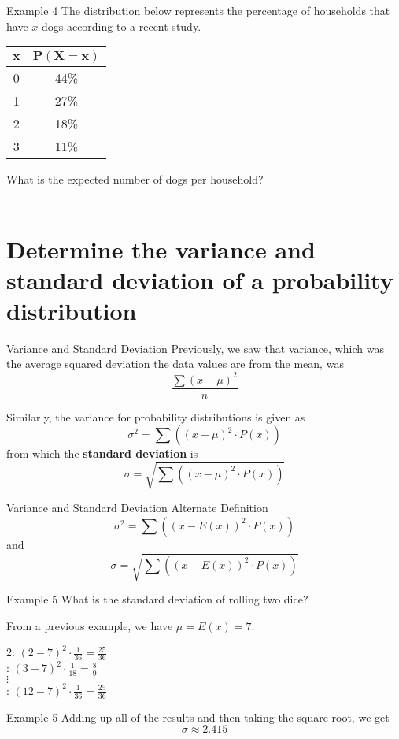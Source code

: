 \documentclass[t]{beamer}
\begin{document}
\begin{frame}{Example 4}
The distribution below represents the percentage of households that have $x$ dogs according to a recent study. \newline
\begin{center}
\begin{tabular}{c|c}
$\bm{x}$ & $\bm{P(X=x)}$ \\ \hline
0 & 44\% \\
1 & 27\% \\
2 & 18\% \\
3 & 11\%
\end{tabular}
\end{center}
What is the expected number of dogs per household?	\newline\\
	\newline\\
\end{frame}

\section{Determine the variance and standard deviation of a probability distribution}

\begin{frame}{Variance and Standard Deviation}
Previously, we saw that variance, which was the average squared deviation the data values are from the mean, was
\[\frac{\sum \left(x-\mu\right)^2}{n}\]
\pause

Similarly, the variance for probability distributions is given as
\[\sigma^2 = \sum\left((x-\mu)^2 \cdot P(x)\right)\]	\pause
from which the {\color{blue}\textbf{standard deviation}} is 
\[\sigma = \sqrt{\sum\left((x-\mu)^2 \cdot P(x)\right)}\]
\end{frame}

\begin{frame}{Variance and Standard Deviation Alternate Definition}
\[\sigma^2 = \sum\left((x-E(x))^2 \cdot P(x)\right)\]	\pause
and
\[\sigma = \sqrt{\sum\left((x-E(x))^2 \cdot P(x)\right)}\]
\end{frame}


\begin{frame}{Example 5}
What is the standard deviation of rolling two dice?	\newline\\	\pause

From a previous example, we have $\mu = E(x) = 7$.	\newline\\	\pause

2: \quad $(2-7)^2 \cdot \frac{1}{36} = \frac{25}{36}$	\newline\\	: \quad $(3-7)^2 \cdot \frac{1}{18} = \frac{8}{9}$ \newline\\ \pause
$\vdots$ \newline\\ : \quad $(12-7)^2 \cdot \frac{1}{36} = \frac{25}{36}$
\end{frame}

\begin{frame}{Example 5}
Adding up all of the results and then taking the square root, we get
\[\sigma \approx 2.415\]
\end{frame}
\end{document}
